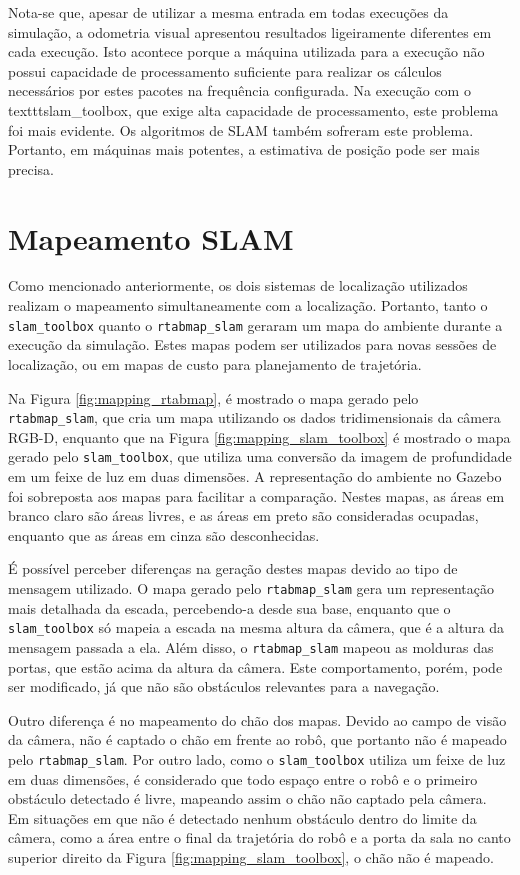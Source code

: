 \documentclass[repeatfields,xlists,xpacks,oneside,yearsonly]{ufrgscca}
\begin{document}
Nota-se que, apesar de utilizar a mesma entrada em todas execuções da
simulação, a odometria visual apresentou resultados ligeiramente
diferentes em cada execução. Isto acontece porque a máquina utilizada
para a execução não possui capacidade de processamento suficiente
para realizar os cálculos necessários por estes pacotes na frequência
configurada. Na execução com o texttt{slam\_toolbox}, que exige alta
capacidade de processamento, este problema foi mais evidente. Os
algoritmos de SLAM também sofreram este problema. Portanto, em
máquinas mais potentes, a estimativa de posição pode ser mais
precisa.

\section{Mapeamento SLAM}

Como mencionado anteriormente, os dois sistemas de localização
utilizados realizam o mapeamento simultaneamente com a localização.
Portanto, tanto o \texttt{slam\_toolbox} quanto o
\texttt{rtabmap\_slam} geraram um mapa do ambiente durante a execução
da simulação. Estes mapas podem ser utilizados para novas sessões de
localização, ou em mapas de custo para planejamento de trajetória.

Na Figura \ref{fig:mapping_rtabmap}, é mostrado o mapa gerado pelo
\texttt{rtabmap\_slam}, que cria um mapa utilizando os dados
tridimensionais da câmera RGB-D, enquanto que na Figura
\ref{fig:mapping_slam_toolbox} é mostrado o mapa gerado pelo
\texttt{slam\_toolbox}, que utiliza uma conversão da imagem de
profundidade em um feixe de luz em duas dimensões. A representação do
ambiente no Gazebo foi sobreposta aos mapas para facilitar a
comparação. Nestes mapas, as áreas em branco claro são áreas livres,
e as áreas em preto são consideradas ocupadas, enquanto que as áreas
em cinza são desconhecidas.

É possível perceber diferenças na geração destes mapas devido ao tipo de mensagem
utilizado. O mapa gerado pelo \texttt{rtabmap\_slam} gera um representação mais
detalhada da escada, percebendo-a desde sua base, enquanto que o \texttt{slam\_toolbox}
só mapeia a escada na mesma altura da câmera, que é a altura da mensagem passada
a ela.
Além disso, o \texttt{rtabmap\_slam} mapeou as molduras das portas, que estão acima
da altura da câmera. Este comportamento, porém, pode ser modificado, já que
não são obstáculos relevantes para a navegação.

Outro diferença é no mapeamento do chão dos mapas. Devido ao campo de
visão da câmera, não é captado o chão em frente ao robô, que portanto
não é mapeado pelo \texttt{rtabmap\_slam}. Por outro lado, como o
\texttt{slam\_toolbox} utiliza um feixe de luz em duas dimensões, é
considerado que todo espaço entre o robô e o primeiro obstáculo
detectado é livre, mapeando assim o chão não captado pela câmera. Em
situações em que não é detectado nenhum obstáculo dentro do limite da
câmera, como a área entre o final da trajetória do robô e a porta da
sala no canto superior direito da Figura
\ref{fig:mapping_slam_toolbox}, o chão não é mapeado.
\end{document}
